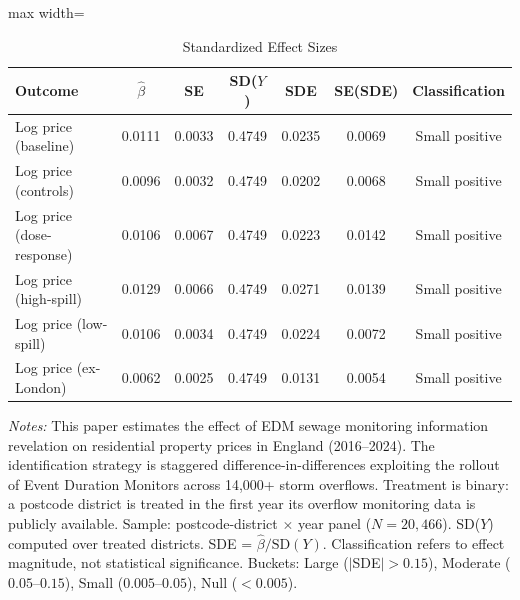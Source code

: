 \begin{table}[htbp]
\centering
\caption{Standardized Effect Sizes}
\label{tab:sde}
\begin{adjustbox}{max width=\textwidth}
\begin{tabular}{lcccccc}
\toprule
Outcome & $\hat{\beta}$ & SE & SD($Y$) & SDE & SE(SDE) & Classification \\
\midrule
Log price (baseline) & 0.0111 & 0.0033 & 0.4749 & 0.0235 & 0.0069 & Small positive \\
Log price (controls) & 0.0096 & 0.0032 & 0.4749 & 0.0202 & 0.0068 & Small positive \\
Log price (dose-response) & 0.0106 & 0.0067 & 0.4749 & 0.0223 & 0.0142 & Small positive \\
Log price (high-spill) & 0.0129 & 0.0066 & 0.4749 & 0.0271 & 0.0139 & Small positive \\
Log price (low-spill) & 0.0106 & 0.0034 & 0.4749 & 0.0224 & 0.0072 & Small positive \\
Log price (ex-London) & 0.0062 & 0.0025 & 0.4749 & 0.0131 & 0.0054 & Small positive \\
\bottomrule
\end{tabular}
\end{adjustbox}
\begin{tablenotes}[flushleft]\small
\item \textit{Notes:} This paper estimates the effect of EDM sewage monitoring information revelation on residential property prices in England (2016--2024). The identification strategy is staggered difference-in-differences exploiting the rollout of Event Duration Monitors across 14,000+ storm overflows. Treatment is binary: a postcode district is treated in the first year its overflow monitoring data is publicly available. Sample: postcode-district $\times$ year panel ($N = 20,466$). SD($Y$) computed over treated districts. SDE = $\hat{\beta} / \text{SD}(Y)$. Classification refers to effect magnitude, not statistical significance. Buckets: Large ($|$SDE$| > 0.15$), Moderate ($0.05$--$0.15$), Small ($0.005$--$0.05$), Null ($< 0.005$).
\end{tablenotes}
\end{table}

